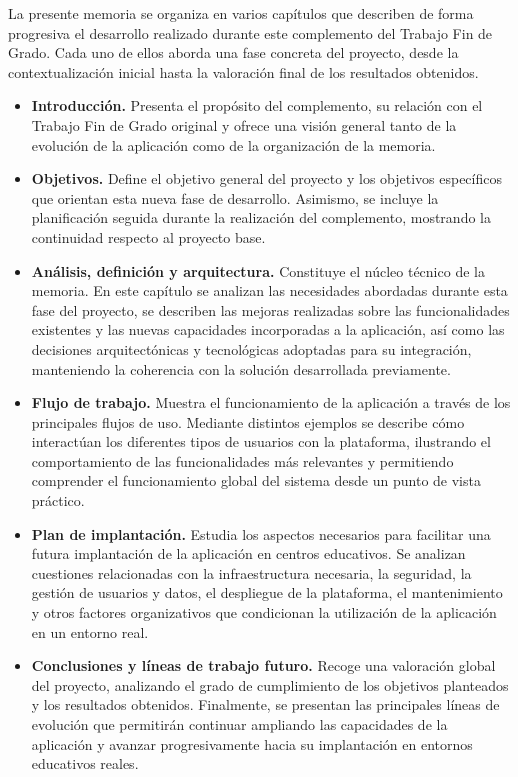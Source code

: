 La presente memoria se organiza en varios capítulos que describen de forma progresiva el desarrollo realizado durante este complemento del Trabajo Fin de Grado. Cada uno de ellos aborda una fase concreta del proyecto, desde la contextualización inicial hasta la valoración final de los resultados obtenidos.

\begin{itemize}

    \item \textbf{Introducción.}  
    Presenta el propósito del complemento, su relación con el Trabajo Fin de Grado original y ofrece una visión general tanto de la evolución de la aplicación como de la organización de la memoria.

    \item \textbf{Objetivos.}  
    Define el objetivo general del proyecto y los objetivos específicos que orientan esta nueva fase de desarrollo. Asimismo, se incluye la planificación seguida durante la realización del complemento, mostrando la continuidad respecto al proyecto base.

    \item \textbf{Análisis, definición y arquitectura.}  
    Constituye el núcleo técnico de la memoria. En este capítulo se analizan las necesidades abordadas durante esta fase del proyecto, se describen las mejoras realizadas sobre las funcionalidades existentes y las nuevas capacidades incorporadas a la aplicación, así como las decisiones arquitectónicas y tecnológicas adoptadas para su integración, manteniendo la coherencia con la solución desarrollada previamente.

    \item \textbf{Flujo de trabajo.}  
    Muestra el funcionamiento de la aplicación a través de los principales flujos de uso. Mediante distintos ejemplos se describe cómo interactúan los diferentes tipos de usuarios con la plataforma, ilustrando el comportamiento de las funcionalidades más relevantes y permitiendo comprender el funcionamiento global del sistema desde un punto de vista práctico.

    \item \textbf{Plan de implantación.}  
    Estudia los aspectos necesarios para facilitar una futura implantación de la aplicación en centros educativos. Se analizan cuestiones relacionadas con la infraestructura necesaria, la seguridad, la gestión de usuarios y datos, el despliegue de la plataforma, el mantenimiento y otros factores organizativos que condicionan la utilización de la aplicación en un entorno real.

    \item \textbf{Conclusiones y líneas de trabajo futuro.}  
    Recoge una valoración global del proyecto, analizando el grado de cumplimiento de los objetivos planteados y los resultados obtenidos. Finalmente, se presentan las principales líneas de evolución que permitirán continuar ampliando las capacidades de la aplicación y avanzar progresivamente hacia su implantación en entornos educativos reales.

\end{itemize}




